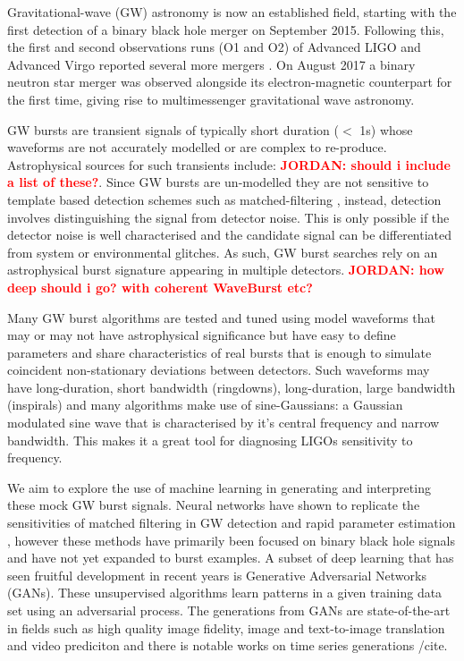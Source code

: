 \documentclass[%
 reprint,
 amsmath,amssymb,
 aps,
]{revtex4-2}
\newcommand{\jordan}[1]{\textbf{\textcolor{red}{JORDAN: #1}}}
\begin{document}
Gravitational-wave (GW) astronomy is now an established field, starting with the first detection 
of a binary black hole merger \cite{} on September 2015. Following this, the first and second 
observations runs (O1 and O2) of Advanced LIGO and Advanced Virgo reported several more mergers \cite{}. 
On August 2017 a binary neutron star merger was observed alongside its electron-magnetic counterpart for 
the first time, giving rise to multimessenger gravitational wave astronomy. 

GW bursts are transient signals of typically short duration ($<$ 1s) whose waveforms are not accurately 
modelled or are complex to re-produce. Astrophysical sources for such transients include:
\jordan{should i include a list of these?}. Since GW bursts are un-modelled they are not sensitive to 
template based detection schemes such as matched-filtering \cite{}, instead, detection involves distinguishing 
the signal from detector noise. This is only possible if the detector noise is well characterised and the candidate 
signal can be differentiated from system or environmental glitches. As such, GW burst searches rely on an astrophysical 
burst signature appearing in multiple detectors. \jordan{how deep should i go? with coherent WaveBurst etc?}

Many GW burst algorithms \cite{cite the shit outta this} are tested and tuned using model waveforms that may or may not 
have astrophysical significance but have easy to define parameters and share characteristics of real bursts that is enough
to simulate coincident non-stationary deviations between detectors. Such waveforms may have long-duration,
short bandwidth (ringdowns), long-duration, large bandwidth (inspirals) and many algorithms make use of sine-Gaussians: 
a Gaussian modulated sine wave that is characterised by it's central frequency and narrow bandwidth. This makes it a great
tool for diagnosing LIGOs sensitivity to frequency. 

We aim to explore the use of machine learning in generating and interpreting these mock GW burst signals. 
Neural networks have shown to replicate the sensitivities of matched filtering in GW detection \cite{} and 
rapid parameter estimation \cite{}, however these methods have primarily been focused on binary black hole 
signals and have not yet expanded to burst examples. A subset of deep learning that has seen fruitful development 
in recent years \cite{} is Generative Adversarial Networks (GANs). These unsupervised algorithms learn patterns in
a given training data set using an adversarial process. The generations from GANs are state-of-the-art in fields such 
as high quality image fidelity, image and text-to-image translation and video prediciton \cite{} and there is notable
works on time series generations /cite. 
\end{document}
